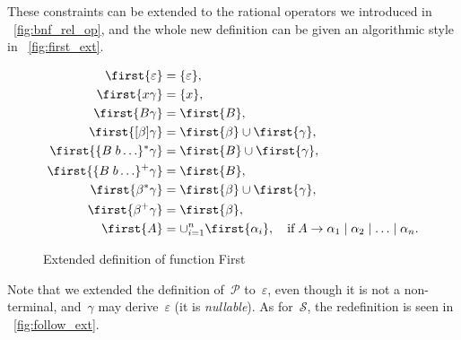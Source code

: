 These constraints can be extended to the rational operators we
introduced in \fig~\vref{fig:bnf_rel_op}, and the whole new definition
can be given an algorithmic style in \fig~\vref{fig:first_ext}.
\begin{figure}[!t]
\centering
\begin{framed}
\begin{align*}
\first{\varepsilon} &= \{\varepsilon\},\\
\first{x \gamma} &= \{x\},\\
\first{B \gamma} &= \first{B},\\
\first{[\beta] \gamma} &= \first{\beta} \cup \first{\gamma},\\
\first{\{B \; b \ldots\}^* \gamma} &= \first{B} \cup \first{\gamma},\\
\first{\{B \; b \ldots\}^+ \gamma} &= \first{B},\\
\first{\beta^*\gamma} &= \first{\beta} \cup \first{\gamma},\\
\first{\beta^+\gamma} &= \first{\beta},\\
\first{A} &= \cup_{i=1}^{n}\first{\alpha_i}, \quad \text{if} \; A
\rightarrow \alpha_1 \mid \alpha_2 \mid \ldots \mid \alpha_n.
\end{align*}
\end{framed}
\caption{Extended definition of function First\label{fig:first_ext}}
\end{figure}
Note that we extended the definition of~\(\mathcal{P}\)
to~\(\varepsilon\), even though it is not a non\hyp{}terminal,
and~\(\gamma\) may derive~\(\varepsilon\) (it is \emph{nullable}). As
for~\(\mathcal{S}\), the redefinition is seen in
\fig~\vref{fig:follow_ext}.
